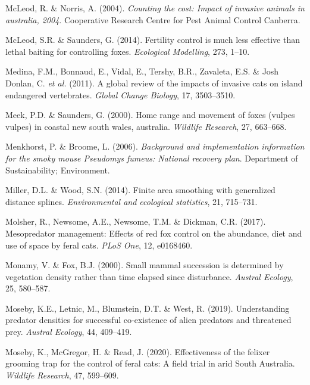\documentclass[11pt,a4paper,titlepage,twoside,openright]{style/unimelbthesis}
\begin{document}
\begin{mainmatter}
\leavevmode\hypertarget{ref-mcleod2004counting}{}%
McLeod, R. \& Norris, A. (2004). \emph{Counting the cost: Impact of invasive animals in australia, 2004}. Cooperative Research Centre for Pest Animal Control Canberra.

\leavevmode\hypertarget{ref-mcleod2014fertility}{}%
McLeod, S.R. \& Saunders, G. (2014). Fertility control is much less effective than lethal baiting for controlling foxes. \emph{Ecological Modelling}, 273, 1--10.

\leavevmode\hypertarget{ref-medina2011global}{}%
Medina, F.M., Bonnaud, E., Vidal, E., Tershy, B.R., Zavaleta, E.S. \& Josh Donlan, C. \emph{et al.} (2011). A global review of the impacts of invasive cats on island endangered vertebrates. \emph{Global Change Biology}, 17, 3503--3510.

\leavevmode\hypertarget{ref-meek2000home}{}%
Meek, P.D. \& Saunders, G. (2000). Home range and movement of foxes (vulpes vulpes) in coastal new south wales, australia. \emph{Wildlife Research}, 27, 663--668.

\leavevmode\hypertarget{ref-menkhorst2006background}{}%
Menkhorst, P. \& Broome, L. (2006). \emph{Background and implementation information for the smoky mouse Pseudomys fumeus: National recovery plan}. Department of Sustainability; Environment.

\leavevmode\hypertarget{ref-miller2014finite}{}%
Miller, D.L. \& Wood, S.N. (2014). Finite area smoothing with generalized distance splines. \emph{Environmental and ecological statistics}, 21, 715--731.

\leavevmode\hypertarget{ref-molsher2017mesopredator}{}%
Molsher, R., Newsome, A.E., Newsome, T.M. \& Dickman, C.R. (2017). Mesopredator management: Effects of red fox control on the abundance, diet and use of space by feral cats. \emph{PLoS One}, 12, e0168460.

\leavevmode\hypertarget{ref-monamy2000small}{}%
Monamy, V. \& Fox, B.J. (2000). Small mammal succession is determined by vegetation density rather than time elapsed since disturbance. \emph{Austral Ecology}, 25, 580--587.

\leavevmode\hypertarget{ref-moseby2019understanding}{}%
Moseby, K.E., Letnic, M., Blumstein, D.T. \& West, R. (2019). Understanding predator densities for successful co-existence of alien predators and threatened prey. \emph{Austral Ecology}, 44, 409--419.

\leavevmode\hypertarget{ref-moseby2020effectiveness}{}%
Moseby, K., McGregor, H. \& Read, J. (2020). Effectiveness of the felixer grooming trap for the control of feral cats: A field trial in arid South Australia. \emph{Wildlife Research}, 47, 599--609.


\end{mainmatter}
\end{document}
